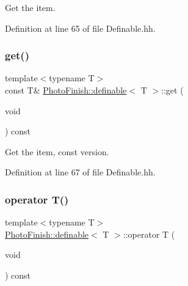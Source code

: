 Get the item. 



Definition at line 65 of file Definable.\+hh.

\mbox{\label{class_photo_finish_1_1definable_a615dcc122a5af98b130316856d3531ea}} 
\subsubsection{\texorpdfstring{get()}{get()}\hspace{0.1cm}{\footnotesize\ttfamily [2/2]}}
{\footnotesize\ttfamily template$<$typename T$>$ \\
const T\& \hyperlink{class_photo_finish_1_1definable}{Photo\+Finish\+::definable}$<$ T $>$\+::get (\begin{DoxyParamCaption}\item[{void}]{ }\end{DoxyParamCaption}) const\hspace{0.3cm}{\ttfamily [inline]}}



Get the item, const version. 



Definition at line 67 of file Definable.\+hh.

\mbox{\label{class_photo_finish_1_1definable_ad51147fde36f7c86f7c4b09bafce45fe}} 
\subsubsection{\texorpdfstring{operator T()}{operator T()}}
{\footnotesize\ttfamily template$<$typename T$>$ \\
\hyperlink{class_photo_finish_1_1definable}{Photo\+Finish\+::definable}$<$ T $>$\+::operator T (\begin{DoxyParamCaption}\item[{void}]{ }\end{DoxyParamCaption}) const\hspace{0.3cm}{\ttfamily [inline]}}



